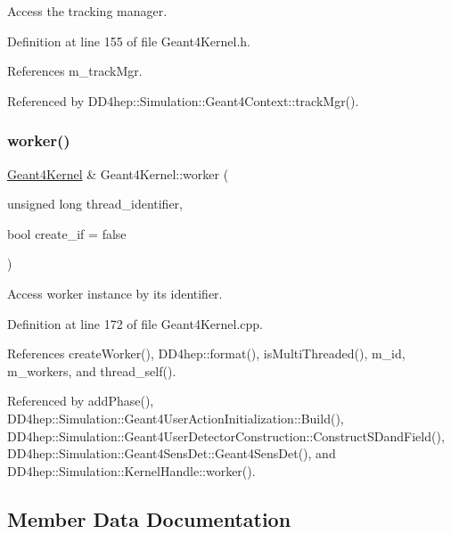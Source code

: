 Access the tracking manager. 



Definition at line 155 of file Geant4\+Kernel.\+h.



References m\+\_\+track\+Mgr.



Referenced by D\+D4hep\+::\+Simulation\+::\+Geant4\+Context\+::track\+Mgr().

\hypertarget{class_d_d4hep_1_1_simulation_1_1_geant4_kernel_ac503376a3f593e2c97dcf78fb289fe49}{}\label{class_d_d4hep_1_1_simulation_1_1_geant4_kernel_ac503376a3f593e2c97dcf78fb289fe49} 
\subsubsection{\texorpdfstring{worker()}{worker()}}
{\footnotesize\ttfamily \hyperlink{class_d_d4hep_1_1_simulation_1_1_geant4_kernel}{Geant4\+Kernel} \& Geant4\+Kernel\+::worker (\begin{DoxyParamCaption}\item[{unsigned long}]{thread\+\_\+identifier,  }\item[{bool}]{create\+\_\+if = {\ttfamily false} }\end{DoxyParamCaption})}



Access worker instance by it\textquotesingle{}s identifier. 



Definition at line 172 of file Geant4\+Kernel.\+cpp.



References create\+Worker(), D\+D4hep\+::format(), is\+Multi\+Threaded(), m\+\_\+id, m\+\_\+workers, and thread\+\_\+self().



Referenced by add\+Phase(), D\+D4hep\+::\+Simulation\+::\+Geant4\+User\+Action\+Initialization\+::\+Build(), D\+D4hep\+::\+Simulation\+::\+Geant4\+User\+Detector\+Construction\+::\+Construct\+S\+Dand\+Field(), D\+D4hep\+::\+Simulation\+::\+Geant4\+Sens\+Det\+::\+Geant4\+Sens\+Det(), and D\+D4hep\+::\+Simulation\+::\+Kernel\+Handle\+::worker().



\subsection{Member Data Documentation}
\hypertarget{class_d_d4hep_1_1_simulation_1_1_geant4_kernel_a6693f4923ea60f878c15f665edf79de2}{}\label{class_d_d4hep_1_1_simulation_1_1_geant4_kernel_a6693f4923ea60f878c15f665edf79de2} 
